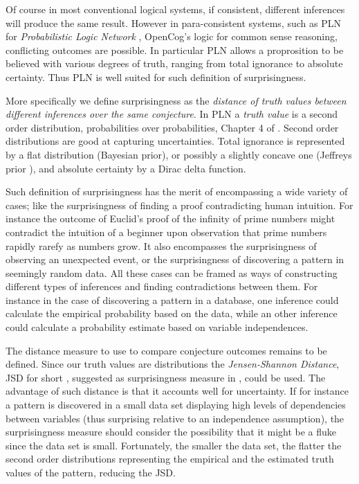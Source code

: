 \documentclass[runningheads]{llncs}
\begin{document}
Of course in
most conventional logical systems, if consistent, different inferences will produce
the same result. However in para-consistent systems, such as PLN for
\emph{Probabilistic Logic Network} \cite{Goertzel2009PLN}, OpenCog's
logic for common sense reasoning, conflicting outcomes are
possible. In particular PLN allows a proprosition to be believed with
various degrees of truth, ranging from total ignorance to absolute
certainty. Thus PLN is well suited for such definition of
surprisingness. 

More specifically we define surprisingness as the
\emph{distance of truth values between different inferences over the
  same conjecture}. In PLN a \emph{truth value} is a second order
distribution, probabilities over probabilities, Chapter 4 of
\cite{Goertzel2009PLN}. Second order distributions are good at
capturing uncertainties. Total ignorance is represented by a flat
distribution (Bayesian prior), or possibly a slightly concave one
(Jeffreys prior%
), and absolute certainty by
a Dirac delta function.

Such definition of surprisingness has the merit of encompassing a wide
variety of cases; like the surprisingness of finding a proof
contradicting human intuition. For instance the outcome of Euclid's
proof of the infinity of prime numbers might contradict the intuition
of a beginner upon observation that prime numbers rapidly rarefy as
numbers grow. It also encompasses the surprisingness of observing an
unexpected event, or the surprisingness of discovering a pattern in
seemingly random data. All these cases can be framed as ways of
constructing different types of inferences and finding contradictions
between them. For instance in the case of discovering a pattern in a
database, one inference could calculate the empirical probability
based on the data, while an other inference could calculate a
probability estimate based on variable independences.

The distance measure to use to compare conjecture outcomes remains to
be defined. Since our truth values are distributions the
\emph{Jensen-Shannon Distance}, JSD for short \cite{Endres2003A},
suggested as surprisingness measure in \cite{Pienta2015AN},
could be used. The advantage of such distance is that it accounts well
for uncertainty. If for instance a pattern is discovered in a small
data set displaying high levels of dependencies between variables
(thus surprising relative to an independence assumption), the
surprisingness measure should consider the possibility that it might
be a fluke since the data set is small. Fortunately, the smaller the
data set, the flatter the second order distributions representing the
empirical and the estimated truth values of the pattern, reducing the
JSD.
\end{document}
